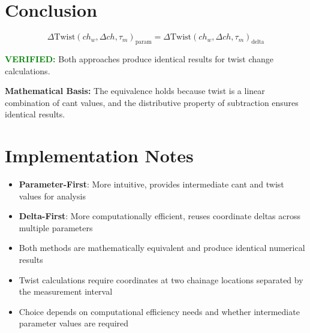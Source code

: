 \documentclass{article}
\begin{document}
\section{Conclusion}
\begin{equation}
\boxed{\Delta\text{Twist}(ch_w, \Delta ch, \tau_m)_{\text{param}} = \Delta\text{Twist}(ch_w, \Delta ch, \tau_m)_{\text{delta}}}
\end{equation}

\textcolor{green}{\textbf{VERIFIED:}} Both approaches produce identical results for twist change calculations.

\textbf{Mathematical Basis:} The equivalence holds because twist is a linear combination of cant values, and the distributive property of subtraction ensures identical results.

\section{Implementation Notes}
\begin{itemize}
\item \textbf{Parameter-First}: More intuitive, provides intermediate cant and twist values for analysis
\item \textbf{Delta-First}: More computationally efficient, reuses coordinate deltas across multiple parameters
\item Both methods are mathematically equivalent and produce identical numerical results
\item Twist calculations require coordinates at two chainage locations separated by the measurement interval
\item Choice depends on computational efficiency needs and whether intermediate parameter values are required
\end{itemize}
\end{document}
